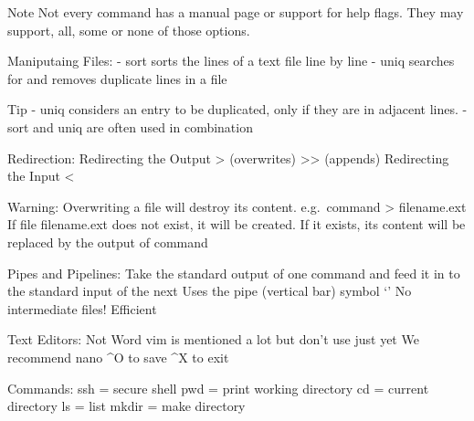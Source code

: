 \documentclass[
]{article}
\begin{document}
Note Not every command has a manual page or support for help flags. They
may support, all, some or none of those options.

Maniputaing Files: - sort sorts the lines of a text file line by line -
uniq searches for and removes duplicate lines in a file

Tip - uniq considers an entry to be duplicated, only if they are in
adjacent lines. - sort and uniq are often used in combination

Redirection: Redirecting the Output \textgreater{} (overwrites)
\textgreater\textgreater{} (appends) Redirecting the Input \textless{}

Warning: Overwriting a file will destroy its content. e.g.~command
\textgreater{} filename.ext If file filename.ext does not exist, it will
be created. If it exists, its content will be replaced by the output of
command

Pipes and Pipelines: Take the standard output of one command and feed it
in to the standard input of the next Uses the pipe (vertical bar) symbol
`\textbar{}' No intermediate files! Efficient

Text Editors: Not Word vim is mentioned a lot but don't use just yet We
recommend nano \^{}O to save \^{}X to exit

Commands: ssh = secure shell pwd = print working directory cd = current
directory ls = list mkdir = make directory
\end{document}
